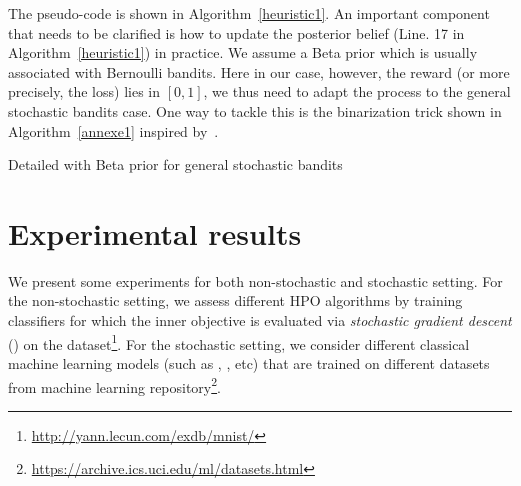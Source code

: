 \documentclass[twoside,11pt]{article}
\begin{document}
The pseudo-code is shown in Algorithm~\ref{heuristic1}. An important component that needs to be clarified is how to update the posterior belief (Line. 17 in Algorithm~\ref{heuristic1}) in practice. We assume a Beta prior which is usually associated with Bernoulli bandits. Here in our case, however, the reward (or more precisely, the loss) lies in $[0, 1]$, we thus need to adapt the \TS process to the general stochastic bandits case. One way to tackle this is the binarization trick shown in Algorithm~\ref{annexe1} inspired by~\cite{agrawal2011analysis}.

\begin{algorithm}[h]

\caption{Detailed \TTTS with Beta prior for general stochastic bandits\label{annexe1}}
\end{algorithm}

\section{Experimental results}\label{sec:result}

We present some experiments for both non-stochastic and stochastic setting. For the non-stochastic setting, we assess different HPO algorithms by training classifiers for which the inner objective is evaluated via \emph{stochastic gradient descent} (\SGD) on the \MNIST dataset\footnote{\url{http://yann.lecun.com/exdb/mnist/}}. For the stochastic setting, we consider different classical machine learning models (such as \SVM, \KNN, etc) that are trained on different datasets from \UCI machine learning repository\footnote{\url{https://archive.ics.uci.edu/ml/datasets.html}}.
\end{document}
